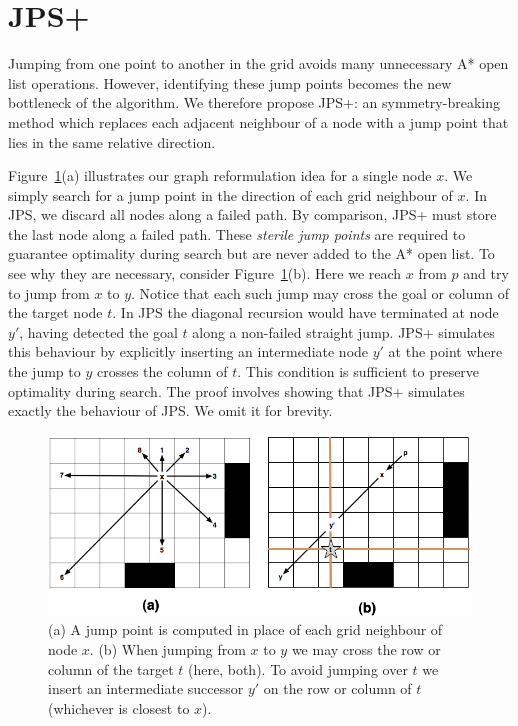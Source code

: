 \section{JPS+}
\label{sec:pre}
Jumping from one point to another in the grid
avoids many unnecessary A* open list operations. However, identifying 
these jump points becomes the new bottleneck of the algorithm. 
We therefore propose JPS+: an symmetry-breaking method which replaces
each adjacent neighbour of a node with a jump point that lies in the 
same relative direction.

Figure~\ref{fig:preproc}(a) illustrates our graph reformulation idea for a 
single node $x$. We simply search for a jump point in the direction
of each grid neighbour of $x$. In JPS, we discard all nodes along a failed
path. By comparison, JPS+ must store the last node along a failed path.
These \emph{sterile jump points} are required 
to guarantee optimality during search but are never added to the A* open list.
To see why they are necessary, consider Figure~\ref{fig:preproc}(b).
Here we reach $x$ from $p$ and try to jump from $x$ to $y$. 
Notice that each such jump may cross the goal or column of the target node
$t$. In JPS the diagonal recursion would have terminated at node $y'$, having detected
the goal $t$ along a non-failed straight jump.
JPS+ simulates this behaviour by explicitly inserting an intermediate node $y'$ 
at the point where the jump to $y$ crosses the column of $t$.
This condition is sufficient to preserve optimality during search. The proof
involves showing that JPS+ simulates exactly the behaviour of JPS. We omit it 
for brevity.

\begin{figure}[tb]
       \begin{center}
		   \includegraphics[width=0.95\columnwidth]
			{diagrams/preproc.png}
       \end{center}
	\vspace{-3pt}
       \caption{(a) A jump point is computed in place of each grid neighbour of node $x$.
		(b) When jumping from $x$ to $y$ we may cross the row or column of the target $t$ (here, both). 
To avoid jumping over $t$ we insert an intermediate successor $y'$ on the row or column of $t$ (whichever is closest to $x$).}

       \label{fig:preproc}
\end{figure}

%


